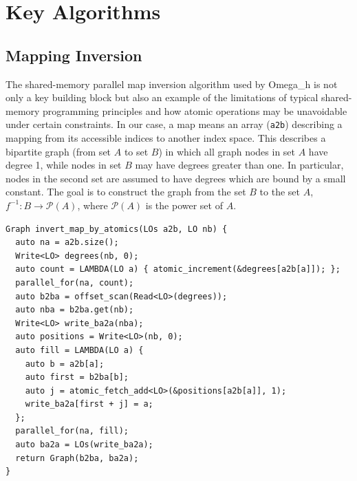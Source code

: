 
\appendix    %

\chapter{Key Algorithms}

\section{Mapping Inversion}
\label{sec:invert_map}

The shared-memory parallel map inversion algorithm used by
Omega\_h is not only a key building block but also an example
of the limitations of typical shared-memory programming principles
and how atomic operations may be unavoidable under certain constraints.
In our case, a map means an array (\texttt{a2b}) describing a mapping from
its accessible indices to another index space.
This describes a bipartite graph (from set $A$ to set $B$) in which all graph nodes
in set $A$ have degree 1, while nodes in set $B$ may
have degrees greater than one.
In particular, nodes in the second set are assumed to have degrees
which are bound by a small constant.
The goal is to construct the graph from the set $B$ to the set $A$,
$f^{-1}:B\to \mathcal{P}(A)$, where $\mathcal{P}(A)$ is the power set of $A$.

\begin{lstlisting}[float,style=dan-style,caption=Invert map by atomics,label=lst:invert_map]
Graph invert_map_by_atomics(LOs a2b, LO nb) {
  auto na = a2b.size();
  Write<LO> degrees(nb, 0);
  auto count = LAMBDA(LO a) { atomic_increment(&degrees[a2b[a]]); };
  parallel_for(na, count);
  auto b2ba = offset_scan(Read<LO>(degrees));
  auto nba = b2ba.get(nb);
  Write<LO> write_ba2a(nba);
  auto positions = Write<LO>(nb, 0);
  auto fill = LAMBDA(LO a) {
    auto b = a2b[a];
    auto first = b2ba[b];
    auto j = atomic_fetch_add<LO>(&positions[a2b[a]], 1);
    write_ba2a[first + j] = a;
  };
  parallel_for(na, fill);
  auto ba2a = LOs(write_ba2a);
  return Graph(b2ba, ba2a);
}
\end{lstlisting}

